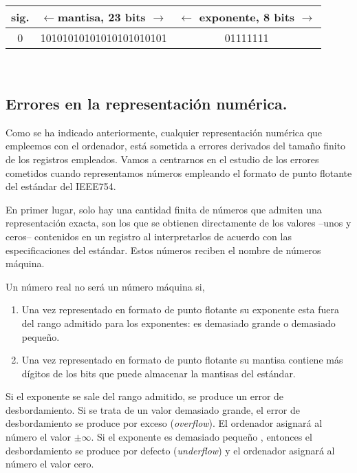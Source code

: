 \begin{minipage}{\textwidth}
\centering
\begin{tabular}{|c||c||c|}
\hline
sig.&$\leftarrow$mantisa, 23 bits $\rightarrow$&$\leftarrow$ exponente, 8 bits $\rightarrow$\\
\hline
0&10101010101010101010101&01111111\\
\hline
\end{tabular}\\

\end{minipage}
\begin{paracol}{2}
\section{Errores en la representación numérica.}\label{errn}
Como se ha indicado anteriormente, cualquier representación numérica que empleemos con el ordenador, está sometida a errores derivados del tamaño finito de los registros empleados. Vamos a centrarnos en el estudio de los errores cometidos cuando representamos números empleando el formato de punto flotante del estándar del IEEE754.

En primer lugar, solo hay una cantidad finita de números que admiten una representación exacta, son los que se obtienen directamente de los valores --unos y ceros-- contenidos en un registro al interpretarlos de acuerdo con las especificaciones del estándar. Estos números reciben el nombre de números máquina. 

Un número real no será un número máquina si, 

\begin{enumerate}
\item Una vez representado en formato de punto flotante su exponente esta fuera del rango admitido para los exponentes: es demasiado grande o demasiado pequeño.

\item Una vez representado en formato de punto flotante su mantisa contiene más dígitos de los bits que puede almacenar la mantisas del estándar. 
\end{enumerate}
 
Si el exponente se sale del rango admitido, se produce un error de desbordamiento. Si se trata de un valor demasiado grande, el error de desbordamiento se produce por exceso (\emph{overflow}). El ordenador asignará al número el valor $\pm \infty$. Si el exponente es demasiado pequeño , entonces el desbordamiento se produce por defecto (\emph{underflow}) y el ordenador asignará al número el valor cero.


\end{paracol}
